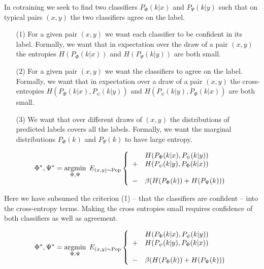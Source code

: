 {{

{\huge
In cotraining we seek to find two classifiers $P_\Phi(k|x)$ and $P_\Psi(k|y)$ such that on typical pairs $(x,y)$ the two classifiers agree on the label.

\begin{itemize}
\item[(1)] For a given pair $(x,y)$ we want each classifier to be confident in its label.  Formally, we want that in expectation over the draw of a pair $(x,y)$ the entropies
$H(P_\Phi(k|x))$ and $H(P_\Psi(k|y))$ are both small.

\item[(2)] For a given pair $(x,y)$ we want the classifiers to agree on the label. Formally, we want that in expectation over a draw of a pair $(x,y)$ the cross-entropies
$H(P_\Phi(k|x),P_\psi(k|y))$ and $H(P_\psi(k|y),P_\Phi(k|x))$ are both small.

\item[(3)] We want that over different draws of $(x,y)$ the distributions of predicted labels covers all the labels.  Formally, we want the marginal distributions $P_\Phi(k)$
and $P_\Psi(k)$ to have large entropy.
\end{itemize}
}



$$\Phi^*,\Psi^* = \operatorname*{argmin}_{\Phi,\Psi}\;E_{(x,y)\sim \mathrm{Pop}} \left\{\begin{array}{cl}&H(P_\Phi(k|x),P_\psi(k|y)) \\ +& H(P_\psi(k|y),P_\Phi(k|x)) \\ \\ - & \beta(H(P_\Phi(k)) + H(P_\Psi(k)))\end{array}\right.$$

\vfill
Here we have subsumed the criterion (1) -- that the classifiers are confident -- into the cross-entropy terms.  Making the cross entropies small requires confidence of both classifiers as well as agreement.


$$\Phi^*,\Psi^* = \operatorname*{argmin}_{\Phi,\Psi}\;E_{(x,y)\sim \mathrm{Pop}} \left\{\begin{array}{cl}&H(P_\Phi(k|x),P_\psi(k|y)) \\ +& H(P_\psi(k|y),P_\Phi(k|x)) \\ \\ - & \beta(H(P_\Phi(k)) + H(P_\Psi(k)))\end{array}\right.$$

}}
